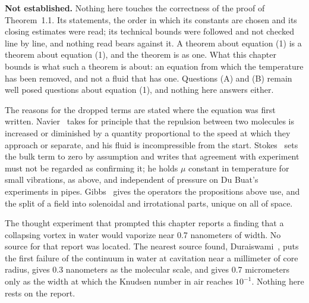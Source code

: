 \textbf{Not established.} Nothing here touches the correctness of the proof of Theorem~1.1. Its
statements, the order in which its constants are chosen and its closing estimates were read; its
technical bounds were followed and not checked line by line, and nothing read bears against it. A
theorem about equation (1) is a theorem about equation (1), and
the theorem is as one. What this chapter bounds is what such a theorem is about: an equation
from which the temperature has been removed, and not a fluid that has one. Questions (A) and (B)
remain well posed questions about equation (1), and nothing here answers either.

The reasons for the dropped terms are stated where the equation was first written.
Navier~\cite{src:Navier-1827} takes for principle that the repulsion between two molecules is
increased or diminished by a quantity proportional to the speed at which they approach or separate,
and his fluid is incompressible from the start. Stokes~\cite{src:Stokes-1845} sets the bulk term
to zero by assumption and writes that agreement with experiment must not be regarded as confirming
it; he holds $\mu$ constant in temperature for small vibrations, as above, and independent of
pressure on Du Buat's experiments in pipes. Gibbs~\cite{src:Gibbs-1884} gives the operators the
propositions above use, and the split of a field into solenoidal and irrotational parts, unique on
all of space.

The thought experiment that prompted this chapter reports a finding that a collapsing vortex in
water would vaporize near 0.7 nanometers of width. No source for that report was located. The
nearest source found, Duraiswami~\cite{src:Duraiswami-2026}, puts the first failure of the
continuum in water at cavitation near a millimeter of core radius, gives 0.3 nanometers as the
molecular scale, and gives 0.7 micrometers only as the width at which the Knudsen number in air
reaches $10^{-1}$. Nothing here rests on the report.
